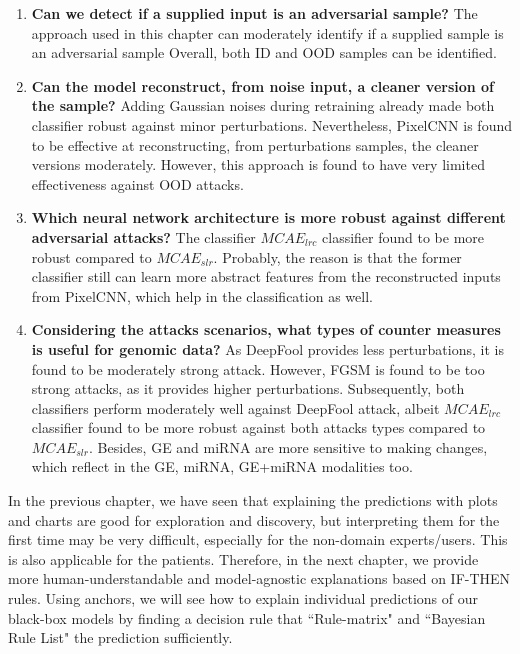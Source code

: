 \begin{enumerate}[noitemsep]
    \item \textbf{Can we detect if a supplied input is an adversarial sample?} The approach used in this chapter can moderately identify if a supplied sample is an adversarial sample Overall, both ID and OOD samples can be identified. 
    
    \item \textbf{Can the model reconstruct, from noise input, a cleaner version of the sample?} Adding Gaussian noises during retraining already made both classifier robust against minor perturbations. Nevertheless, PixelCNN is found to be effective at reconstructing, from perturbations samples, the cleaner versions moderately. However, this approach is found to have very limited effectiveness against OOD attacks. 
    
    \item \textbf{Which neural network architecture is more robust against different adversarial attacks?} The classifier $MCAE_{lrc}$ classifier found to be more robust compared to $MCAE_{slr}$. Probably, the reason is that the former classifier still can learn more abstract features from the reconstructed inputs from PixelCNN, which help in the classification as well.  
    
    \item \textbf{Considering the attacks scenarios, what types of counter measures is useful for genomic data?} As DeepFool provides less perturbations, it is found to be moderately strong attack. However, FGSM is found to be too strong attacks, as it provides higher perturbations. Subsequently, both classifiers perform moderately well against DeepFool attack, albeit $MCAE_{lrc}$ classifier found to be more robust against both attacks types compared to $MCAE_{slr}$. Besides, GE and miRNA are more sensitive to making changes, which reflect in the GE, miRNA, GE+miRNA modalities too. 
\end{enumerate}


\hspace*{3.5mm} In the previous chapter, we have seen that explaining the predictions with plots and charts are good for exploration and discovery, but interpreting them for the first time may be very difficult, especially for the non-domain experts/users. This is also applicable for the patients. Therefore, in the next chapter, we provide more human-understandable and model-agnostic explanations based on IF-THEN rules. Using anchors, we will see how to explain individual predictions of our black-box models by finding a decision rule that ``Rule-matrix" and ``Bayesian Rule List" the prediction sufficiently. 

